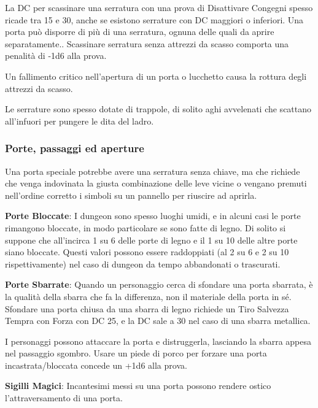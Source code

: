 \begin{multicols}{2}
La DC per scassinare una serratura con una prova di Disattivare Congegni spesso ricade tra 15 e 30, anche se esistono serrature con DC maggiori o inferiori. Una porta può disporre di più di una serratura, ognuna delle quali da aprire separatamente.. Scassinare serratura senza attrezzi da scasso comporta una penalità di -1d6 alla prova.\hypertarget{Attrezzi da scasso}{}

Un fallimento critico nell'apertura di un porta o lucchetto causa la rottura degli attrezzi da scasso.

Le serrature sono spesso dotate di trappole, di solito aghi avvelenati che scattano all'infuori per pungere le dita del ladro.

\subsubsection{Porte, passaggi ed aperture}

Una porta speciale potrebbe avere una serratura senza chiave, ma che richiede che venga indovinata la giusta combinazione delle leve vicine o vengano premuti nell'ordine corretto i simboli su un pannello per riuscire ad aprirla.

\textbf{Porte Bloccate}: I dungeon sono spesso luoghi umidi, e in alcuni casi le porte rimangono bloccate, in modo particolare se sono fatte di legno. Di solito si suppone che all'incirca 1 su 6 delle porte di legno e il 1 su 10 delle altre porte siano bloccate. Questi valori possono essere raddoppiati (al 2 su 6 e 2 su 10 rispettivamente) nel caso di dungeon da tempo abbandonati o trascurati.

\textbf{Porte Sbarrate}: Quando un personaggio cerca di sfondare una porta sbarrata, è la qualità della sbarra che fa la differenza, non il materiale della porta in sé. Sfondare una porta chiusa da una sbarra di legno richiede un Tiro Salvezza Tempra con Forza con DC 25, e la DC sale a 30 nel caso di una sbarra metallica.

I personaggi possono attaccare la porta e distruggerla, lasciando la sbarra appesa nel passaggio sgombro. Usare un piede di porco per forzare una porta incastrata/bloccata concede un +1d6 alla prova.

\textbf{Sigilli Magici}: Incantesimi messi su una porta possono rendere ostico l'attraversamento di una porta.


\end{multicols}

